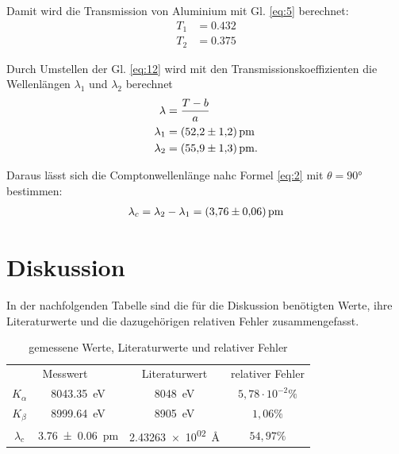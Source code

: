 Damit wird die Transmission von Aluminium mit Gl. \eqref{eq:5} berechnet:
\begin{subequations}
\begin{align}
    T_1 &= 0.432 \label{16a}\\
    T_2 &= 0.375 \label{16b} 
\end{align}
\end{subequations}

Durch Umstellen der Gl. \eqref{eq:12} wird mit den Transmissionskoeffizienten
die Wellenlängen $\lambda _1$ und $\lambda _2$ berechnet
\begin{subequations}
\begin{align}
    \lambda &= \frac{T-b}{a} \label{17a}\\
    \lambda _1 &= \SI{52.2+-1.2}{\pico\meter} \label{17b}\\
    \lambda _2 &= \SI{55.9+-1.3}{\pico\meter} \label{17c}.
\end{align}
\end{subequations}

Daraus lässt sich die Comptonwellenlänge nahc Formel \eqref{eq:2} mit $\theta = 90°$
bestimmen:
\begin{align}
    \lambda _c = \lambda _2 - \lambda _1 = \SI{3.76+-0.06}{\pico\meter} \label{eq:18}
\end{align}



\section{Diskussion}

In der nachfolgenden Tabelle sind die für die Diskussion benötigten Werte, ihre Literaturwerte und
die dazugehörigen relativen Fehler zusammengefasst.
\begin{table}[H]
\centering
\begin{tabular}{c c c c}
\toprule
\multicolumn{2}{c}{Messwert}& \multicolumn{1}{c}{Literaturwert}& \multicolumn{1}{c}{relativer Fehler} \\
\cmidrule(lr){1-2}
$K_{\alpha}$    &   \SI{8043.35}{\electronvolt} & \SI{8048}{\electronvolt} \cite{K_Linie} & $5,78\cdot 10^{-2 }\%$\\
$K_{\beta} $    &   \SI{8999.64}{\electronvolt} & \SI{8905}{\electronvolt} \cite{K_Linie} & $1,06\%$\\
$\lambda _c$    &   \SI{3.76+-0.06}{\pico\meter} & \SI{2.43263e02}{\angstrom} \cite{nolting2013grundlagen} & $54,97\%$\\
\bottomrule
\end{tabular}
\caption{gemessene Werte, Literaturwerte und relativer Fehler}
\label{tab:3}
\end{table}

